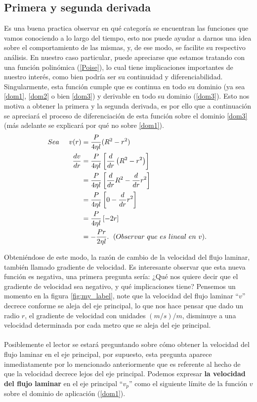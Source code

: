 \subsection{Primera y segunda derivada}
Es una buena practica observar en qué categoría se encuentran las funciones que vamos conociendo a lo largo del tiempo, esto nos puede ayudar a darnos una idea sobre el comportamiento de las mismas, y, de ese modo, se facilite su respectivo análisis. En nuestro caso particular, puede apreciarse que estamos tratando con una función polinómica (\ref{Poise}), lo cual tiene implicaciones importantes de nuestro interés, como bien podría ser su continuidad y diferenciabilidad. Singularmente, esta función cumple que es continua en todo su dominio (ya sea \ref{dom1}, \ref{dom2} o bien \ref{dom3}) y derivable en todo su dominio (\ref{dom3}). Esto nos motiva a obtener la primera y la segunda derivada, es por ello que a continuación se apreciará el proceso de diferenciación de esta función sobre el dominio \ref{dom3} (más adelante se explicará por qué no sobre \ref{dom1}).
\begin{align}
    Sea \hspace{0.5cm} v(r)&=\frac{P}{4\eta l}(R^{2}-r^{2})\\
    \frac{dv}{dr}&=\frac{P}{4\eta l}\left[\frac{d}{dr}\left(R^{2}-r^{2}\right)\right]\\
    &=\frac{P}{4\eta l}\left[\frac{d}{dr}R^{2}-\frac{d}{dr}r^{2}\right]\\
    &=\frac{P}{4\eta l}\left[0-\frac{d}{dr}r^{2}\right]\\
    &=\frac{P}{4\eta l}\left[-2r\right]\\
    &=-\frac{Pr}{2\eta l}. \hspace{0.1cm}\label{derivative_one} \text{ $(Observar\ que \ es \ lineal \ en\ v).$ }
\end{align}

 Obteniéndose de este modo, la razón de cambio de la velocidad del flujo laminar, también llamado gradiente de velocidad. Es interesante observar que esta nueva función es negativa, una primera pregunta sería: ¿Qué nos quiere decir que el gradiente de velocidad sea negativo, y qué implicaciones tiene? Pensemos un momento en la figura \ref{fig:my_label}, note que la velocidad del flujo laminar ``$v$'' decrece conforme se aleja del eje principal, lo que nos hace pensar que dado un radio $r$, el gradiente de velocidad con unidades $(m/s)/m$, disminuye a una velocidad determinada por cada metro que se aleja del eje principal.\\ \\
 Posiblemente el lector se estará preguntando sobre cómo obtener la velocidad del flujo laminar en el eje principal, por supuesto, esta pregunta aparece inmediatamente por lo mencionado anteriormente que es referente al hecho de que la velocidad decrece lejos del eje principal. Podemos expresar
 \textbf{la velocidad del flujo laminar} en el eje principal ``$v_{p}$'' como el siguiente límite de la función $v$ sobre el dominio de aplicación (\ref{dom1}).
 
